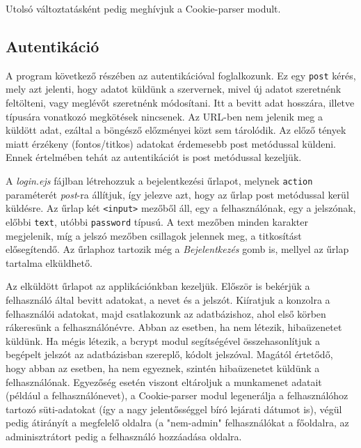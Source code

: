 Utolsó változtatásként pedig meghívjuk a Cookie-parser modult.


\subsection{Autentikáció}

A program következő részében az autentikációval foglalkozunk. Ez egy \texttt{post} kérés, mely azt jelenti, hogy adatot küldünk a szervernek, mivel új adatot szeretnénk feltölteni, vagy meglévőt szeretnénk módosítani. Itt a bevitt adat hosszára, illetve típusára vonatkozó megkötések nincsenek. Az URL-ben nem jelenik meg a küldött adat, ezáltal a böngésző előzményei közt sem tárolódik. Az előző tények miatt érzékeny (fontos/titkos) adatokat érdemesebb post metódussal küldeni. Ennek értelmében tehát az autentikációt is post metódussal kezeljük.

A \textit{login.ejs} fájlban létrehozzuk a bejelentkezési űrlapot, melynek \texttt{action} paraméterét \textit{post}-ra állítjuk, így jelezve azt, hogy az űrlap post metódussal kerül küldésre. Az űrlap két \texttt{<input>} mezőből áll, egy a felhasználónak, egy a jelszónak,  előbbi \texttt{text}, utóbbi \texttt{password} típusú. A text mezőben minden karakter megjelenik, míg a jelszó mezőben csillagok jelennek meg, a titkosítást elősegítendő. Az űrlaphoz tartozik még a \textit{Bejelentkezés} gomb is, mellyel az űrlap tartalma elküldhető.

Az elküldött űrlapot az applikációnkban kezeljük. Először is bekérjük a felhasználó által bevitt adatokat, a nevet és a jelszót. Kiíratjuk a konzolra a felhasználói adatokat, majd csatlakozunk az adatbázishoz, ahol első körben rákeresünk a felhasználónévre. Abban az esetben, ha nem létezik, hibaüzenetet küldünk. Ha mégis létezik, a bcrypt modul segítségével összehasonlítjuk a begépelt jelszót az adatbázisban szereplő, kódolt jelszóval. Magától értetődő, hogy abban az esetben, ha nem egyeznek, szintén hibaüzenetet küldünk a felhasználónak. Egyezőség esetén viszont eltároljuk a munkamenet adatait (például a felhasználónevet), a Cookie-parser modul legenerálja a felhasználóhoz tartozó süti-adatokat (így a nagy jelentősséggel bíró lejárati dátumot is), végül pedig átirányít a megfelelő oldalra (a "nem-admin" felhasználókat a főoldalra, az adminisztrátort pedig a felhasználó hozzáadása oldalra.


